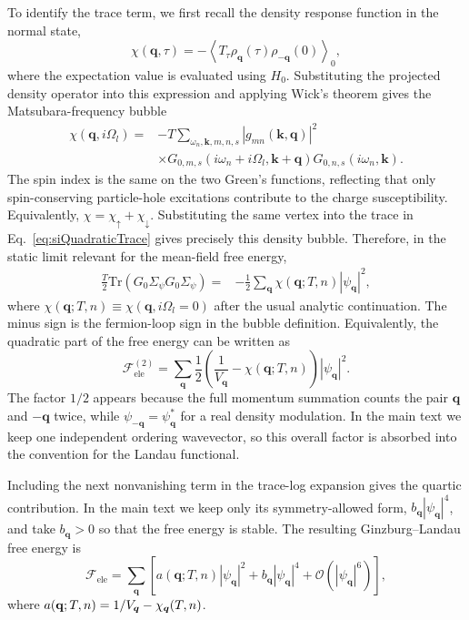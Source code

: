 \documentclass[aps,prl,article,twocolumn,preprintnumbers,amsmath,amssymb,superscriptaddress]{revtex4-2}
\begin{document}
To identify the trace term, we first recall the density response function
in the normal state,
\begin{equation}
\chi(\mathbf q,\tau)
=
-
\left\langle
T_\tau
\rho_{\mathbf q}(\tau)
\rho_{-\mathbf q}(0)
\right\rangle_{0},
\end{equation}
where the expectation value is evaluated using $H_0$.  Substituting the
projected density operator into this expression and applying Wick's
theorem gives the Matsubara-frequency bubble
\begin{align}
\chi(\mathbf q,i\Omega_l)
=&
-
T
\sum_{\omega_n,\mathbf k,m,n,s}
\left|
g_{mn}(\mathbf k,\mathbf q)
\right|^2
\nonumber\\
&\times
G_{0,m,s}(i\omega_n+i\Omega_l,\mathbf k+\mathbf q)
G_{0,n,s}(i\omega_n,\mathbf k).
\end{align}
The spin index is the same on the two Green's functions, reflecting that
only spin-conserving particle-hole excitations contribute to the charge
susceptibility.  Equivalently, $\chi=\chi_\uparrow+\chi_\downarrow$.
Substituting the same vertex into the trace in
Eq.~\eqref{eq:siQuadraticTrace} gives precisely this density bubble.
Therefore, in the static limit relevant for the
mean-field free energy,
\begin{align}\label{eq:siBubbleTrace}
\frac{T}{2}
\mathrm{Tr}
\left(
G_0\Sigma_\psi
G_0\Sigma_\psi
\right)
=&
-
\frac{1}{2}
\sum_{\mathbf q}
\chi(\mathbf q;T,n)
|\psi_{\mathbf q}|^2 ,
\end{align}
where $\chi(\mathbf q;T,n)\equiv \chi(\mathbf q,i\Omega_l=0)$ after the
usual analytic continuation.  The minus sign is the fermion-loop sign in
the bubble definition.  Equivalently, the quadratic part of the free
energy can be written as
\begin{equation}
\mathcal F_{\mathrm{ele}}^{(2)}
=
\sum_{\mathbf q}
\frac{1}{2}
\left(\frac{1}{V_{\mathbf q}}
-
\chi(\mathbf q;T,n)
\right)
|\psi_{\mathbf q}|^2 .
\end{equation}
The factor $1/2$ appears because the full momentum summation counts the
pair $\mathbf q$ and $-\mathbf q$ twice, while
$\psi_{-\mathbf q}=\psi_{\mathbf q}^{*}$ for a real density modulation.
In the main text we keep one independent ordering wavevector, so this
overall factor is absorbed into the convention for the Landau functional.

Including the next nonvanishing term in the trace-log expansion gives the
quartic contribution.  In the main text we keep only its symmetry-allowed
form, $b_{\mathbf q}|\psi_{\mathbf q}|^4$, and take $b_{\mathbf q}>0$ so
that the free energy is stable.  The resulting Ginzburg--Landau free
energy is
\begin{equation}
\mathcal F_{\mathrm{ele}}
=
\sum_{\mathbf q} \left[
a(\mathbf q;T,n)
|\psi_{\mathbf q}|^2
+
b_{\mathbf q}
|\psi_{\mathbf q}|^4
+
\mathcal{O}(|\psi_{\mathbf q}|^6) \right],
\end{equation}
where $a(\mathbf q;T,n) = 1/V_{\vb*{q}} - \chi_{\vb*{q}}(T,n)$.
\end{document}
